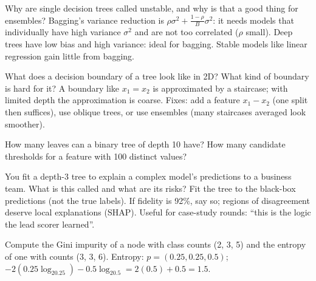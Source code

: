 \begin{qa}{\deep Why are single decision trees called unstable, and why is that a good thing for ensembles?}
\why Bagging's variance reduction is $\rho\sigma^2 + \frac{1-\rho}{B}\sigma^2$: it needs models that individually have high
variance $\sigma^2$ and are not too correlated ($\rho$ small). Deep trees have low bias and high variance: ideal for bagging.
Stable models like linear regression gain little from bagging.
\end{qa}

\begin{qa}{What does a decision boundary of a tree look like in 2D? What kind of boundary is hard for it?}
\why A boundary like $x_1 = x_2$ is approximated by a staircase; with limited depth the approximation is coarse. Fixes: add a
feature $x_1 - x_2$ (one split then suffices), use oblique trees, or use ensembles (many staircases averaged look smoother).
\end{qa}

\begin{qa}{How many leaves can a binary tree of depth 10 have? How many candidate thresholds for a feature with 100
distinct values?}
\end{qa}

\begin{qa}{\deep You fit a depth-3 tree to explain a complex model's predictions to a business team. What is this called and what
are its risks?}
\why Fit the tree to the black-box predictions (not the true labels). If fidelity is 92\%, say so; regions of disagreement deserve
local explanations (SHAP). Useful for case-study rounds: ``this is the logic the lead scorer learned''.
\end{qa}

\begin{qa}{Compute the Gini impurity of a node with class counts (2, 3, 5) and the entropy of one with counts (3, 3, 6).}
\why Entropy: $p = (0.25, 0.25, 0.5)$; $-2(0.25\log_20.25) - 0.5\log_20.5 = 2(0.5) + 0.5 = 1.5$.
\end{qa}

